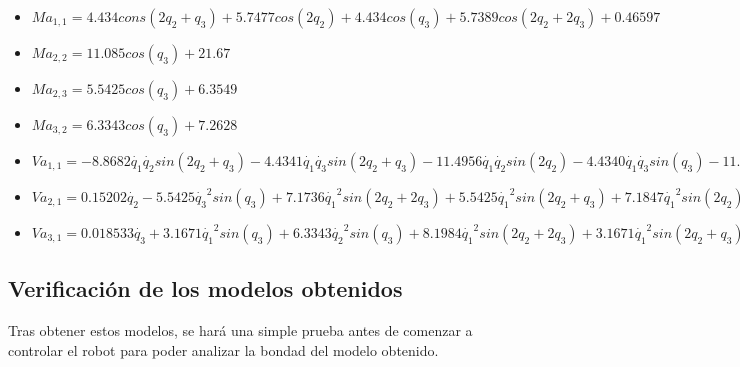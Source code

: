 \begin{itemize}

	\item $ Ma_{1,1}=4.434cons(2q_2 + q_3) + 5.7477cos(2q_2) + 4.434cos(q_3) + 5.7389cos(2q_2 + 2q_3) + 0.46597$ \\ \vspace{0.2cm}

	\item $ Ma_{2,2}= 11.085cos(q_3) + 21.67$ \\ \vspace{0.2cm}

	\item $ Ma_{2,3}=5.5425cos(q_3) + 6.3549$ \\ \vspace{0.2cm}

	\item $ Ma_{3,2}= 6.3343cos(q_3) + 7.2628 $ \\ \vspace{0.2cm}

	\item $ Va_{1,1}= -8.8682\dot{q_{1}}\dot{q_{2}}sin(2q_2 + q_3) - 4.4341\dot{q_{1}}\dot{q_{3}}sin(2q_2 + q_3) - 11.4956\dot{q_{1}}\dot{q_{2}}sin(2q_2)  - 4.4340\dot{q_{1}}\dot{q_{3}}sin(q_3) - 11.4779\dot{q_{1}}\dot{q_{2}}sin(2q_2 + 2q_3) - 11.4779\dot{q_{1}}\dot{q_{3}}sin(2q_2 + 2q_3) + 0.0363 $ \\ \vspace{0.2cm}

	\item $ Va_{2,1}= 0.15202\dot{q_{2}} - 5.5425\dot{q_{3}}^2sin(q_3) + 7.1736\dot{q_{1}}^2sin(2q_2 + 2q_3) + 5.5425\dot{q_{1}}^2sin(2q_2 + q_3) + 7.1847\dot{q_{1}}^2sin(2q_2) - 11.085\dot{q_{2}}\dot{q_{3}}sin(q_3)$ \\ \vspace{0.2cm}

	\item $ Va_{3,1}=  0.018533\dot{q_{3}} + 3.1671\dot{q_{1}}^{2}sin(q_3) + 6.3343\dot{q_{2}}^{2}sin(q_3) + 8.1984\dot{q_{1}}^{2}sin(2q_2 + 2q_3) + 3.1671\dot{q_{1}}^{2}sin(2q_2 + q_3)$

\end{itemize}

\newpage

\subsection{Verificación de los modelos obtenidos}

Tras obtener estos modelos, se hará una simple prueba antes de comenzar a controlar el robot para poder analizar la bondad del modelo obtenido.\\

